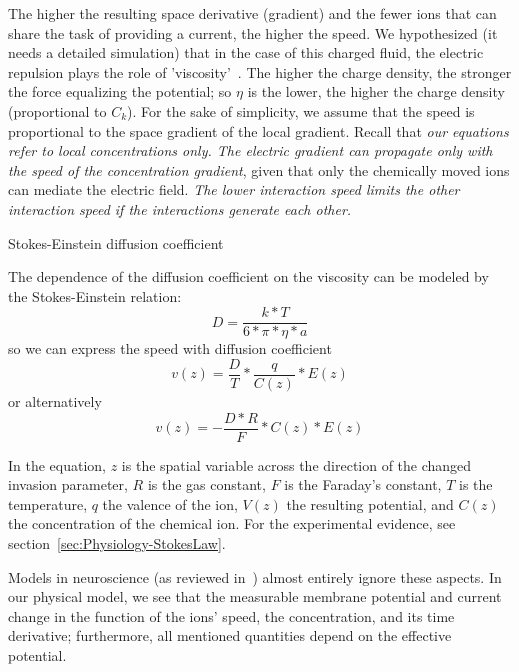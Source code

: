 The higher the resulting space derivative (gradient) and the fewer ions that
can share the task of providing a current, the higher the speed. We hypothesized (it needs
a detailed simulation) that in the case of this charged fluid, the
electric repulsion plays the role of 'viscosity'~\cite{VeghNon-ordinaryLaws:2025}. The higher the charge
density, the stronger the force equalizing the potential; so $\eta$
is the lower, the higher the charge density (proportional to $C_{k}$).
For the sake of simplicity, we assume that the speed is proportional
to the space gradient of the local gradient. Recall that \emph{our equations
refer to local concentrations only. The electric gradient can propagate
only with the speed of the concentration gradient}, given that only
the chemically moved ions can mediate the electric field. \emph{The
lower interaction speed limits the other interaction speed if the
interactions generate each other.}

{Stokes-Einstein diffusion coefficient}
{
The dependence of the diffusion coefficient on the viscosity can be modeled by the Stokes-Einstein relation:
\begin{equation}
\label{eq:StokesEinstein}
D = \frac{k*T}{6*\pi*\eta*a}
\end{equation}
so we can express the speed with diffusion coefficient
\begin{equation}
v(z) = \frac{D}{T}*\frac{q}{C(z)}*E(z)\label{eq:StokesEinsteinSpeeddV}
\end{equation}
or alternatively
\begin{equation}
v(z)= -\frac{D*R}{F}*C(z)*E(z)
\label{eq:StokesEinsteinSpeeddC}
\end{equation}


In the
equation, $z$ is the spatial variable across the direction of the
changed invasion parameter, $R$ is the gas constant, $F$ is the
Faraday's constant, $T$ is the temperature, $q$ the valence
of the ion, ${V(z)}$ the resulting potential, and ${C(z)}$ the concentration
of the chemical ion. For the experimental evidence, see section~\ref{sec:Physiology-StokesLaw}.
}

Models in neuroscience (as reviewed in~\cite{BrainNetworkModels:2018})
almost entirely ignore these aspects. In our physical model, we see
that the measurable membrane potential and current change in the function
of the ions' speed, the concentration, and its time derivative;
furthermore, all mentioned quantities depend on the effective potential. 


